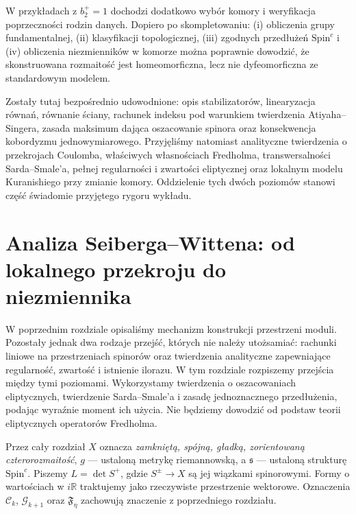 W przykładach z $b_2^+=1$ dochodzi dodatkowo
wybór komory i weryfikacja poprzeczności rodzin danych.
Dopiero po skompletowaniu: (i) obliczenia grupy fundamentalnej,
(ii) klasyfikacji topologicznej, (iii) zgodnych przedłużeń
$\mathrm{Spin}^c$ i (iv) obliczenia niezmienników w komorze
można poprawnie dowodzić, że skonstruowana rozmaitość
jest homeomorficzna, lecz nie dyfeomorficzna ze standardowym
modelem.

\begin{uwaga}
Zostały tutaj bezpośrednio udowodnione: opis stabilizatorów,
linearyzacja równań, równanie ściany, rachunek indeksu
pod warunkiem twierdzenia Atiyaha--Singera, zasada maksimum
dająca oszacowanie spinora oraz konsekwencja kobordyzmu
jednowymiarowego. Przyjęliśmy natomiast analityczne
twierdzenia o przekrojach Coulomba, właściwych własnościach
Fredholma, transwersalności Sarda--Smale'a, pełnej
regularności i zwartości eliptycznej oraz lokalnym modelu
Kuranishiego przy zmianie komory. Oddzielenie tych dwóch
poziomów stanowi część świadomie przyjętego rygoru wykładu.
\end{uwaga}


\chapter{Analiza Seiberga--Wittena: od lokalnego przekroju do niezmiennika}
\label{ch:tg-sw-analiza-uzup}

W poprzednim rozdziale opisaliśmy mechanizm konstrukcji przestrzeni moduli.
Pozostały jednak dwa rodzaje przejść, których nie należy utożsamiać:
rachunki liniowe na przestrzeniach spinorów oraz twierdzenia analityczne
zapewniające regularność, zwartość i istnienie ilorazu. W tym rozdziale
rozpiszemy przejścia między tymi poziomami. Wykorzystamy twierdzenia
o oszacowaniach eliptycznych, twierdzenie Sarda--Smale'a i zasadę
jednoznacznego przedłużenia, podając wyraźnie moment ich użycia.
Nie będziemy dowodzić od podstaw teorii eliptycznych operatorów Fredholma.

Przez cały rozdział $X$ oznacza \emph{zamkniętą, spójną, gładką,
zorientowaną czterorozmaitość}, $g$ --- ustaloną metrykę riemannowską,
a $\mathfrak s$ --- ustaloną strukturę $\mathrm{Spin}^c$.
Piszemy $L=\det S^+$, gdzie $S^\pm\to X$ są jej wiązkami spinorowymi.
Formy o wartościach w $i\mathbb R$ traktujemy jako rzeczywiste
przestrzenie wektorowe. Oznaczenia $\mathcal C_k$, $\mathcal G_{k+1}$
oraz $\mathfrak F_\eta$ zachowują znaczenie z poprzedniego rozdziału.

